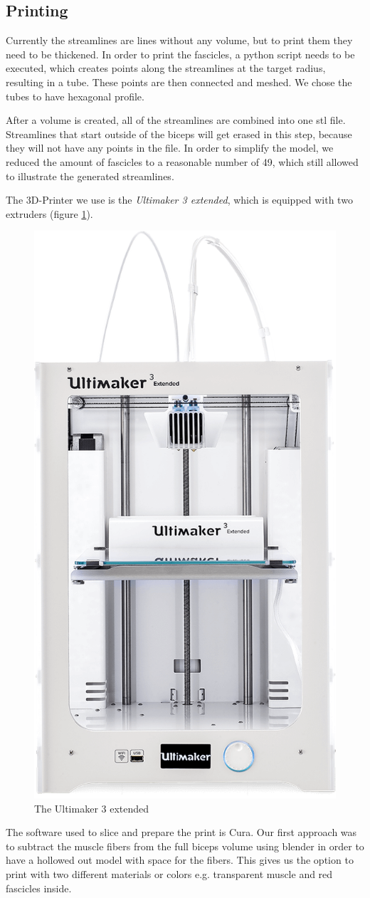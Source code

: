 \documentclass[preprint,journal]{vgtc}       %
\begin{document}
\subsection{Printing}
Currently the streamlines are lines without any volume, but to print them they need to be thickened. 
In order to print the fascicles, a python script needs to be executed, which creates points along the streamlines at the target radius, resulting in a tube.
These points are then connected and meshed. 
We chose the tubes to have hexagonal profile.

After a volume is created, all of the streamlines are combined into one stl file. 
Streamlines that start outside of the biceps will get erased in this step, because they will not have any points in the file. 
In order to simplify the model, we reduced the amount of fascicles to a reasonable number of 49, which still allowed to illustrate the generated streamlines.

The 3D-Printer we use is the \textit{Ultimaker 3 extended}, which is equipped with two extruders (figure \ref{fig:3dPrinter}). %

\begin{figure}
	\centering
	\includegraphics[width=.4\linewidth]{ultimaker-pinter.png}
	\caption{The Ultimaker 3 extended}
	\label{fig:3dPrinter}
\end{figure}

The software used to slice and prepare the print is Cura. 
Our first approach was to subtract the muscle fibers from the full biceps volume using blender in order to have a hollowed out model with space for the fibers. 
This gives us the option to print with two different materials or colors e.g. transparent muscle and red fascicles inside. 
\end{document}
